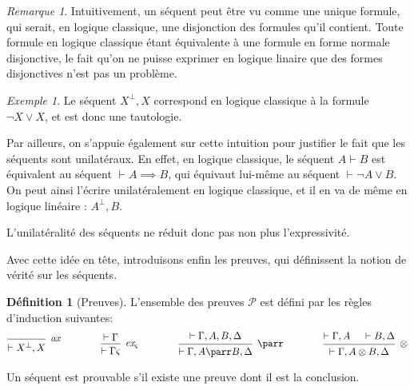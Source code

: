 \documentclass[11pt,a4paper]{article}
\theoremstyle{plain}
\theoremstyle{definition}
\newtheorem{definition}{Définition}
\theoremstyle{remark}
\newtheorem{remark}{Remarque}
\newtheorem{example}{Exemple}
\newcommand*{\orth}{^\perp}
\newcommand*{\tensor}{\otimes}
\newcommand*{\hypv}[1]{\hypo{\vdash #1}}
\newcommand*{\axv}[1]{\infer{0}[\ensuremath{\mathit{ax}}]{\vdash #1}}
\newcommand*{\tensorv}[1]{\infer{2}[\ensuremath{\tensor}]{\vdash #1}}
\newcommand*{\parrv}[1]{\infer{1}[\ensuremath{\parr}]{\vdash #1}}
\newcommand*{\permv}[2]{\infer{1}[\ensuremath{\textit{ex}_{#1}}]{\vdash #2}}
\newcommand*{\permapp}[2]{#2 #1}
\newcommand*{\someperm}{\varsigma}
\newcommand*{\sequent}{\Gamma}
\newcommand*{\sequentbis}{\Delta}
\newcommand*{\proofs}{\ensuremath{\mathcal{P}}}
\begin{document}
\begin{remark}
    Intuitivement, un séquent peut être vu comme une unique formule, qui serait, en logique classique, une disjonction des formules qu'il contient. Toute formule en logique classique étant équivalente à une formule en forme normale disjonctive, le fait qu'on ne puisse exprimer en logique linaire que des formes disjonctives n'est pas un problème.

    \begin{example}
    \label{example_tautology}
    Le séquent $X\orth, X$ correspond en logique classique à la formule $\neg X \lor X$, et est donc une tautologie.
    \end{example}

    Par ailleurs, on s'appuie également sur cette intuition pour justifier le fait que les séquents sont unilatéraux. En effet, en logique classique, le séquent $A \vdash B$ est équivalent au séquent $\vdash A \implies B$, qui équivaut lui-même au séquent $\vdash \neg A \lor B$. On peut ainsi l'écrire unilatéralement en logique classique, et il en va de même en logique linéaire : $A\orth, B$.
    
    L'unilatéralité des séquents ne réduit donc pas non plus l'expressivité.
\end{remark}

Avec cette idée en tête, introduisons enfin les preuves, qui définissent la notion de vérité sur les séquents.

\begin{definition}[Preuves]
\label{proofs_def}
L'ensemble des preuves \proofs{} est défini par les règles d'induction suivantes:
\begin{equation*}
\begin{prooftree}
  \axv{X\orth, X}
\end{prooftree}
\qquad\qquad
\begin{prooftree}
  \hypv{\sequent}
  \permv{\someperm}{\permapp{\someperm}{\sequent}}
\end{prooftree}
\qquad\qquad
\begin{prooftree}
  \hypv{\sequent, A, B, \sequentbis}
  \parrv{\sequent, A \parr B, \sequentbis}
\end{prooftree}
\qquad\qquad
\begin{prooftree}
  \hypv{\sequent, A}
  \hypv{B, \sequentbis}
  \tensorv{\sequent, A \tensor B, \sequentbis}
\end{prooftree}
\end{equation*}

Un séquent est prouvable s'il existe une preuve dont il est la conclusion.
\end{definition}
\end{document}
